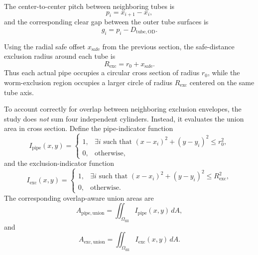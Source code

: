 \documentclass{article}
\begin{document}
The center-to-center pitch between neighboring tubes is
\begin{equation}
p_i = x_{i+1} - x_i,
\end{equation}
and the corresponding clear gap between the outer tube surfaces is
\begin{equation}
g_i = p_i - D_{\mathrm{tube,OD}}.
\end{equation}

Using the radial safe offset $x_{\mathrm{safe}}$ from the previous section,
the safe-distance exclusion radius around each tube is
\begin{equation}
R_{\mathrm{exc}} = r_0 + x_{\mathrm{safe}}.
\end{equation}
Thus each actual pipe occupies a circular cross section of radius $r_0$,
while the worm-exclusion region occupies a larger circle of radius
$R_{\mathrm{exc}}$ centered on the same tube axis.

To account correctly for overlap between neighboring exclusion envelopes, the
study does \emph{not} sum four independent cylinders. Instead, it evaluates
the union area in cross section. Define the pipe-indicator function
\begin{equation}
I_{\mathrm{pipe}}(x,y)
=
\begin{cases}
1, & \exists i \text{ such that } (x-x_i)^2 + (y-y_i)^2 \le r_0^2, \\
0, & \text{otherwise},
\end{cases}
\end{equation}
and the exclusion-indicator function
\begin{equation}
I_{\mathrm{exc}}(x,y)
=
\begin{cases}
1, & \exists i \text{ such that } (x-x_i)^2 + (y-y_i)^2 \le R_{\mathrm{exc}}^2, \\
0, & \text{otherwise}.
\end{cases}
\end{equation}
The corresponding overlap-aware union areas are
\begin{equation}
A_{\mathrm{pipe,union}}
=
\iint_{\Omega_{\mathrm{fill}}} I_{\mathrm{pipe}}(x,y)\, dA,
\end{equation}
and
\begin{equation}
A_{\mathrm{exc,union}}
=
\iint_{\Omega_{\mathrm{fill}}} I_{\mathrm{exc}}(x,y)\, dA.
\end{equation}
\end{document}
